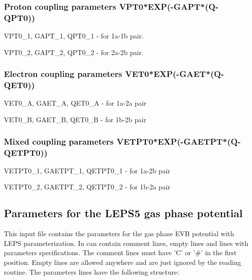 \documentclass[oneside,11pt,openany]{book}
\newcommand{\tw}{\ttfamily}
\begin{document}
\subsubsection*{Proton coupling parameters
               {\tw VPT0*EXP(-GAPT*(Q-QPT0))}}
\begin{description}
\item {\tw VPT0\_1, GAPT\_1, QPT0\_1} - for 1a-1b pair.
\item {\tw VPT0\_2, GAPT\_2, QPT0\_2} - for 2a-2b pair.
\end{description}

\subsubsection*{Electron coupling parameters
               {\tw VET0*EXP(-GAET*(Q-QET0))}}
\begin{description}
\item {\tw VET0\_A, GAET\_A, QET0\_A} - for 1a-2a pair
\item {\tw VET0\_B, GAET\_B, QET0\_B} - for 1b-2b pair
\end{description}

\subsubsection*{Mixed coupling parameters
               {\tw VETPT0*EXP(-GAETPT*(Q-QETPT0))}}
\begin{description}
\item {\tw VETPT0\_1, GAETPT\_1, QETPT0\_1} - for 1a-2b pair
\item {\tw VETPT0\_2, GAETPT\_2, QETPT0\_2} - for 1b-2a pair
\end{description}

\subsection{Parameters for the LEPS5 gas phase potential}
%
This input file contains the parameters for the gas phase
EVB potential with LEPS parameterization. In can
contain comment lines, empty lines and lines with parameters
specifications. The comment lines must have 'C' or '\#'
in the first position. Empty lines are allowed anywhere
and are just ignored by the reading routine. The parameters
lines have the following structure:

\begin{description}
\item {\tw <Parameter name>} {\tw <numerical value>}
\end{description}
\end{document}
